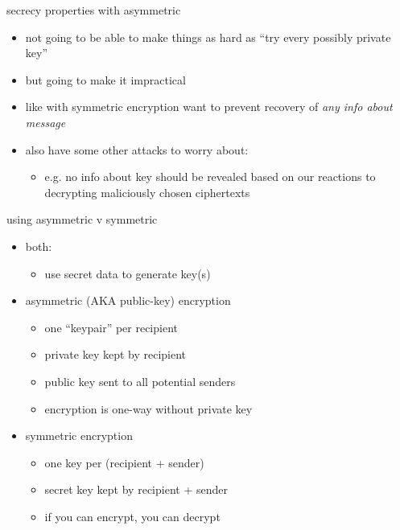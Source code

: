 \begin{frame}{secrecy properties with asymmetric}
    \begin{itemize}
    \item not going to be able to make things as hard as ``try every possibly private key''
    \item but going to make it impractical
    \vspace{.5cm}
    \item like with symmetric encryption want to prevent recovery of \textit{any info about message}
    \item also have some other attacks to worry about:
        \begin{itemize}
        \item e.g. no info about key should be revealed based on our reactions to decrypting maliciously chosen ciphertexts
        \end{itemize}
    \end{itemize}
\end{frame}

\begin{frame}{using asymmetric v symmetric}
\begin{itemize}
    \item both:
        \begin{itemize}
            \item use secret data to generate key(s)
        \end{itemize}
    \item asymmetric (AKA public-key) encryption
        \begin{itemize}
            \item one ``keypair'' per recipient
            \item private key kept by recipient
            \item public key sent to all potential senders
            \item encryption is one-way without private key
        \end{itemize}
    \item symmetric encryption
        \begin{itemize}
            \item one key per (recipient + sender)
            \item secret key kept by recipient + sender
            \item if you can encrypt, you can decrypt
        \end{itemize}
\end{itemize}
\end{frame}

